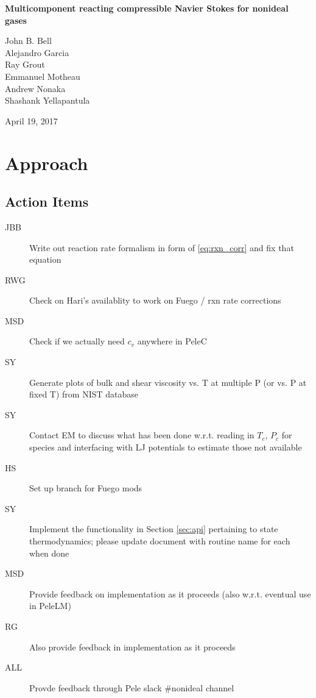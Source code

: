 \documentclass[11pt]{article}
\begin{document}
\begin{center}
{\bf
Multicomponent reacting compressible Navier Stokes for nonideal gases
}

\vspace{\baselineskip}
John B. Bell \\
Alejandro Garcia \\
Ray Grout \\
Emmanuel Motheau \\
Andrew Nonaka \\
Shashank Yellapantula

\vspace{\baselineskip}
April 19, 2017
\end{center}

\section{Approach}
\subsection{Action Items}
\begin{description}
    \item[JBB] Write out reaction rate formalism in form of \ref{eq:rxn_corr} and fix that equation
    \item[RWG] Check on Hari's availablity to work on Fuego / rxn rate corrections
    \item[MSD] Check if we actually need $c_v$ anywhere in PeleC
    \item[SY] Generate plots of bulk and shear viscosity vs. T at multiple P (or vs. P at fixed T) from NIST database 
    \item[SY] Contact EM to discuss what has been done w.r.t. reading in $T_c$, $P_c$ for species and interfacing with LJ potentials to estimate those not available
    \item[HS] Set up branch for Fuego mods
    \item[SY] Implement the functionality in Section \ref{sec:api} pertaining to state thermodynamics; please update document with routine name for each when done
    \item[MSD] Provide feedback on implementation as it proceeds (also w.r.t. eventual use in PeleLM)
    \item[RG] Also provide feedback in implementation as it proceeds
    \item[ALL] Provde feedback through Pele slack \#nonideal channel 
\end{description}
\end{document}
